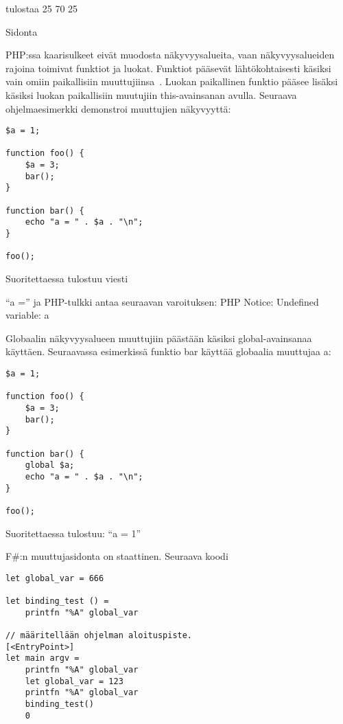 tulostaa 25 70 25

Sidonta

PHP:ssa kaarisulkeet eivät muodosta näkyvyysalueita, vaan näkyvyysalueiden rajoina toimivat funktiot ja luokat. Funktiot pääsevät lähtökohtaisesti käsiksi vain omiin paikallisiin muuttujiinsa~\cite{man_php_scope}. Luokan paikallinen funktio pääsee lisäksi käsiksi luokan paikallisiin muutujiin this-avainsanan avulla. Seuraava ohjelmaesimerkki demonstroi muuttujien näkyvyyttä:

\lstset{language=PHP,
	basicstyle=\ttfamily,
	breaklines=true,
	columns=fullflexible}
	
\begin{lstlisting}
$a = 1;

function foo() {
    $a = 3;
    bar();
}

function bar() {
    echo "a = " . $a . "\n";
}

foo();
\end{lstlisting}

Suoritettaessa tulostuu viesti

“a =” ja PHP-tulkki antaa seuraavan varoituksen: PHP Notice:  Undefined variable: a

Globaalin näkyvyysalueen muuttujiin päästään käsiksi global-avainsanaa käyttäen. Seuraavassa esimerkissä funktio bar käyttää globaalia muuttujaa a:

\begin{lstlisting}
$a = 1;

function foo() {
    $a = 3;
    bar();
}

function bar() {
    global $a;
    echo "a = " . $a . "\n";
}

foo();
\end{lstlisting}

Suoritettaessa tulostuu: “a = 1”


F\#:n muuttujasidonta on staattinen. Seuraava koodi

\lstset{
	language=FSharp,
	basicstyle=\ttfamily,
	breaklines=true,
	columns=fullflexible
}

\begin{lstlisting}
let global_var = 666

let binding_test () =
    printfn "%A" global_var

// määritellään ohjelman aloituspiste.
[<EntryPoint>]
let main argv =
    printfn "%A" global_var
    let global_var = 123
    printfn "%A" global_var
    binding_test()
    0
\end{lstlisting}

